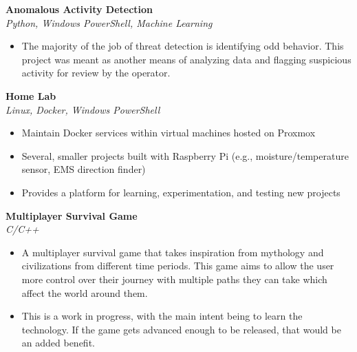 \documentclass[a4paper]{article}
\begin{document}
            {\textbf{Anomalous Activity Detection}}\\
            \textit{Python, Windows PowerShell, Machine Learning}
            \vspace{-1mm}
            \begin{itemize} \itemsep 1pt
            
                    \item The majority of the job of threat detection is identifying odd behavior. This project was meant as another means of analyzing data and flagging suspicious activity for review by the operator.
                
            \end{itemize}
            \vspace*{2mm}
            
            {\textbf{Home Lab}}\\
            \textit{Linux, Docker, Windows PowerShell}
            \vspace{-1mm}
            \begin{itemize} \itemsep 1pt
            
                    \item Maintain Docker services within virtual machines hosted on Proxmox
                
                    \item Several, smaller projects built with Raspberry Pi (e.g., moisture/temperature sensor, EMS direction finder)
                
                    \item Provides a platform for learning, experimentation, and testing new projects
                
            \end{itemize}
            \vspace*{2mm}
            
            {\textbf{Multiplayer Survival Game}}\\
            \textit{C/C++}
            \vspace{-1mm}
            \begin{itemize} \itemsep 1pt
            
                    \item A multiplayer survival game that takes inspiration from mythology and civilizations from different time periods. This game aims to allow the user more control over their journey with multiple paths they can take which affect the world around them.
                
                    \item This is a work in progress, with the main intent being to learn the technology. If the game gets advanced enough to be released, that would be an added benefit.
                
            \end{itemize}
            \vspace*{2mm}
            
\end{document}

